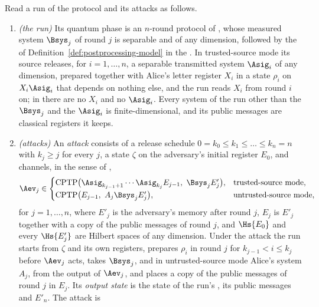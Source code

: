 \begin{lemma}\label{lem:memory-lift}
Read a run of the protocol and its attacks as follows.
\begin{enumerate}[label=(\alph*),leftmargin=2.4em]
\item \emph{(the run)} Its quantum phase is an $n$-round protocol of
  , whose measured system $\Bsys_j$ of round $j$
  is separable and of any dimension, followed by the
   of
  Definition~\ref{def:postprocessing-model} in the
  . In trusted-source mode its source
  releases, for $i=1,\dots,n$, a separable transmitted system
  $\Asig_i$ of any dimension, prepared together with Alice's letter register
  $X_i$ in a state $\rho_i$ on $X_i\Asig_i$ that depends on nothing else, and
  the run reads $X_i$ from round $i$ on; in  there
  are no $X_i$ and no $\Asig_i$. Every system of the run other than the
  $\Bsys_j$ and the $\Asig_i$ is finite-dimensional, and its public messages
  are classical registers it keeps.
\item \emph{(attacks)} An \emph{attack} consists of a release schedule
  $0=k_0\le k_1\le\dots\le k_n=n$ with $k_j\ge j$ for every $j$, a state
  $\zeta$ on the adversary's initial register $E_0$, and channels, in the
  sense of ,
  \begin{equation}\label{eq:lift-attack}
    \Aev_j\in
    \begin{cases}
      \mathrm{CPTP}\big(\Asig_{k_{j-1}+1}\cdots\Asig_{k_j}E_{j-1},\
        \Bsys_jE'_j\big), & \text{trusted-source mode},\\[0.3ex]
      \mathrm{CPTP}\big(E_{j-1},\ A_j\Bsys_jE'_j\big),
        & \text{untrusted-source mode},
    \end{cases}
  \end{equation}
  for $j=1,\dots,n$, where $E'_j$ is the adversary's memory after round $j$,
  $E_j$ is $E'_j$ together with a copy of the public messages of round $j$,
  and $\Hs{E_0}$ and every $\Hs{E'_j}$ are Hilbert spaces of any dimension.
  Under the attack the run starts from $\zeta$ and its own registers, prepares
  $\rho_i$ in round $j$ for $k_{j-1}<i\le k_j$ before $\Aev_j$ acts, takes
  $\Bsys_j$, and in untrusted-source mode Alice's system $A_j$, from the
  output of $\Aev_j$, and places a copy of the public messages of round $j$ in
  $E_j$. Its \emph{output state} is the state of the run's
  , its public messages and $E'_n$. The attack is

\end{enumerate}
\end{lemma}
